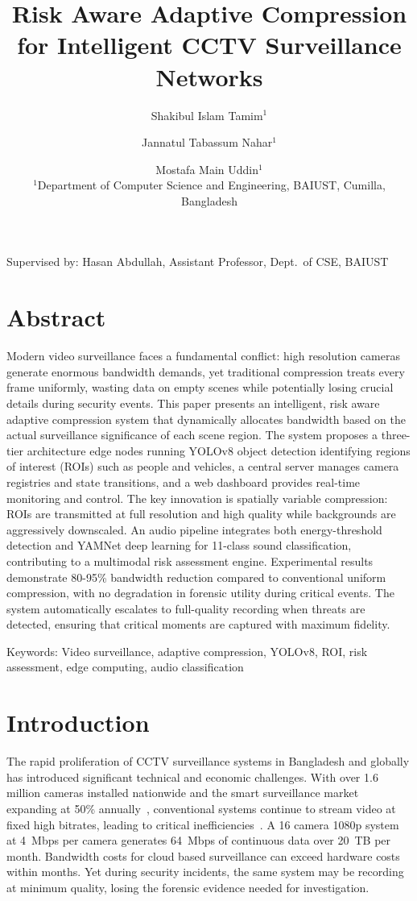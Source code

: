 \documentclass[11pt,a4paper]{article}
\title{Risk Aware Adaptive Compression for Intelligent CCTV Surveillance Networks}
\author{Shakibul Islam Tamim$^{1}$ \and Jannatul Tabassum Nahar$^{1}$ \and Mostafa Main Uddin$^{1}$ \\ $^{1}$Department of Computer Science and Engineering, BAIUST, Cumilla, Bangladesh}
\date{}
\begin{document}
\maketitle

\begin{center}
Supervised by: Hasan Abdullah, Assistant Professor, Dept.\ of CSE, BAIUST
\end{center}

\section*{Abstract}
Modern video surveillance faces a fundamental conflict: high resolution cameras generate enormous bandwidth demands, yet traditional compression treats every frame uniformly, wasting data on empty scenes while potentially losing crucial details during security events. This paper presents an intelligent, risk aware adaptive compression system that dynamically allocates bandwidth based on the actual surveillance significance of each scene region. The system proposes a three-tier architecture edge nodes running YOLOv8 object detection identifying regions of interest (ROIs) such as people and vehicles, a central server manages camera registries and state transitions, and a web dashboard provides real-time monitoring and control. The key innovation is spatially variable compression: ROIs are transmitted at full resolution and high quality while backgrounds are aggressively downscaled. An audio pipeline integrates both energy-threshold detection and YAMNet deep learning for 11-class sound classification, contributing to a multimodal risk assessment engine. Experimental results demonstrate 80-95\% bandwidth reduction compared to conventional uniform compression, with no degradation in forensic utility during critical events. The system automatically escalates to full-quality recording when threats are detected, ensuring that critical moments are captured with maximum fidelity.

\noindent Keywords: Video surveillance, adaptive compression, YOLOv8, ROI, risk assessment, edge computing, audio classification

\section{Introduction}
The rapid proliferation of CCTV surveillance systems in Bangladesh and globally has introduced significant technical and economic challenges. With over 1.6 million cameras installed nationwide and the smart surveillance market expanding at 50\% annually~\cite{islam2024sdn}, conventional systems continue to stream video at fixed high bitrates, leading to critical inefficiencies~\cite{ahmad2024bandwidth}. A 16 camera 1080p system at 4~Mbps per camera generates 64~Mbps of continuous data over 20~TB per month. Bandwidth costs for cloud based surveillance can exceed hardware costs within months. Yet during security incidents, the same system may be recording at minimum quality, losing the forensic evidence needed for investigation.
\end{document}
